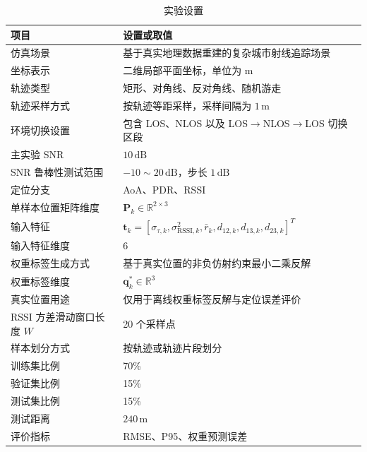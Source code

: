 \begin{table}[H]
    \centering
    \caption{实验设置}
    \label{tab:ch3_dataset_setting}
    \vspace{-0.4em}
    \begingroup
    \footnotesize
    \setlength{\tabcolsep}{4pt}
    \renewcommand{\arraystretch}{0.90}
    \begin{tabular}{@{}p{}p{}@{}}
        \toprule
        \textbf{项目} & \textbf{设置或取值} \\
        \midrule
        仿真场景 & 基于真实地理数据重建的复杂城市射线追踪场景 \\
        坐标表示 & 二维局部平面坐标，单位为 m \\
        轨迹类型 & 矩形、对角线、反对角线、随机游走 \\
        轨迹采样方式 & 按轨迹等距采样，采样间隔为 \(1\,\mathrm{m}\) \\
        环境切换设置 & 包含 LOS、NLOS 以及 LOS$\rightarrow$NLOS$\rightarrow$LOS 切换区段 \\
        主实验 SNR & \(10\,\mathrm{dB}\) \\
        SNR 鲁棒性测试范围 & \(-10\sim20\,\mathrm{dB}\)，步长 \(1\,\mathrm{dB}\) \\
        定位分支 & AoA、PDR、RSSI \\
        单样本位置矩阵维度 & \(\mathbf{P}_k\in\mathbb{R}^{2\times3}\) \\
        输入特征 & \(\mathbf{t}_k=[\sigma_{\tau,k},\sigma^2_{\mathrm{RSSI},k},\bar r_k,d_{12,k},d_{13,k},d_{23,k}]^T\) \\
        输入特征维度 & 6 \\
        权重标签生成方式 & 基于真实位置的非负仿射约束最小二乘反解 \\
        权重标签维度 & \(\mathbf{q}_k^\ast\in\mathbb{R}^{3}\) \\
        真实位置用途 & 仅用于离线权重标签反解与定位误差评价 \\
        RSSI 方差滑动窗口长度 \(W\) & 20 个采样点 \\
        样本划分方式 & 按轨迹或轨迹片段划分 \\
        训练集比例 & 70\% \\
        验证集比例 & 15\% \\
        测试集比例 & 15\% \\
        测试距离 &  \(240\,\mathrm{m}\) \\
        评价指标 & RMSE、P95、权重预测误差 \\
        \bottomrule
    \end{tabular}
    \endgroup
    \vspace{-0.8em}
\end{table}

